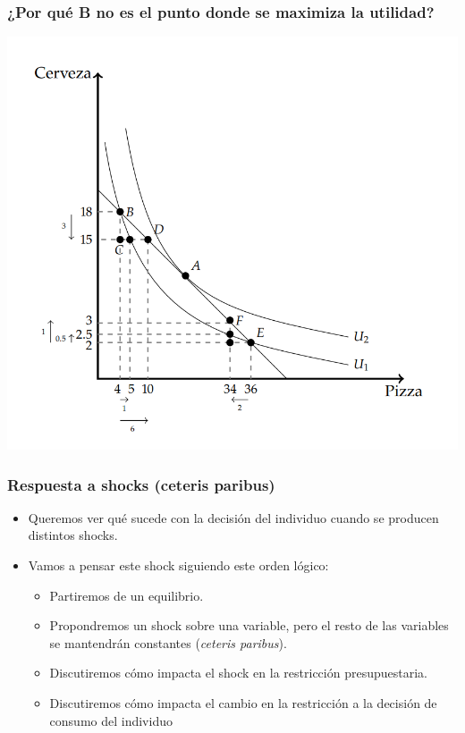 \documentclass{beamer}
\begin{document}
\begin{frame}
\frametitle{¿Por qué B no es el punto donde se maximiza la utilidad?}
\centering
\includegraphics[scale=0.6]{Slides Principios de Economia/Figures/C8.3.png}
\end{frame}

\begin{frame}
\frametitle{Respuesta a shocks (ceteris paribus)}
\begin{itemize}
    \item Queremos ver qué sucede con la decisión del individuo cuando se producen distintos shocks. \vspace{2mm}
    \item Vamos a pensar este shock siguiendo este orden lógico:
    \begin{itemize}
        \item Partiremos de un equilibrio.
        \item Propondremos un shock sobre una variable, pero el resto de las variables se mantendrán constantes (\textit{ceteris paribus}).
        \item Discutiremos cómo impacta el shock en la restricción presupuestaria.      
        \item Discutiremos cómo impacta el cambio en la restricción a la decisión de consumo del individuo
    \end{itemize}
\end{itemize} 
\end{frame}
\end{document}
